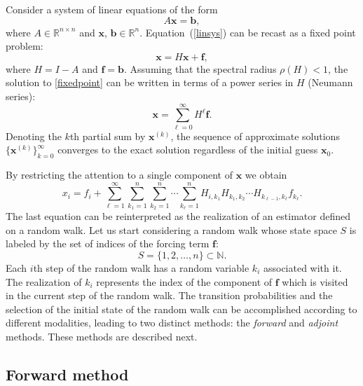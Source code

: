 \documentclass[final,leqno,onefignum,onetabnum]{siamltex1213}
\begin{document}
Consider a system of linear equations of the form
\begin{equation}
A \mathbf{x}=\mathbf{b},
\label{linsys}
\end{equation}
where $A\in \mathbb{R}^{n\times n}$ and $\mathbf{x}$, $\mathbf{b} \in
\mathbb{R}^n$.
Equation~(\ref{linsys}) can be recast as a fixed point problem:
\begin{equation}
 \mathbf{x}=H\mathbf{x}+\mathbf{f},
 \label{fixedpoint}
\end{equation}
where $H=I-A$ and $\mathbf{f}=\mathbf{b}$.
Assuming that the spectral radius $\rho(H)<1$, the solution to
\eqref{fixedpoint} can be written in terms of a power series in
$H$ (Neumann series):
\[
\mathbf{x}=\sum_{\ell=0}^\infty H^\ell\mathbf{f}.
\]
Denoting the $k$th partial sum by $\mathbf{x}^{(k)}$, the sequence of approximate solutions
$\{\mathbf{x}^{(k)}\}_{k=0}^{\infty}$ converges to the exact solution
regardless of the initial guess $\mathbf{x}_0$.

By restricting the attention to a single component of $\mathbf{x}$ we
obtain
\begin{equation}
x_i=f_i + \sum_{\ell=1}^\infty \sum_{k_1=1}^n\sum_{k_2=1}^n\cdots
\sum_{k_{\ell}=1}^n
H_{i,k_1}H_{k_1,k_2}\cdots H_{k_{\ell-1}, k_{\ell}}f_{k_{\ell}}.
\label{forward}
\end{equation}
The last equation can be reinterpreted as the realization of an estimator
defined on a random walk.  Let us start considering a random walk whose
state space $S$ is labeled by the set of indices of the forcing term
$\mathbf{f}$:
\[
S=\{1,2,\ldots, n\} \subset \mathbb{N}.
\]
Each $i$th step of the random walk has a random variable
$k_i$ associated with it. The realization of $k_i$ represents the index of the
component of $\mathbf{f}$
which is visited in the current step of the random walk.
The transition probabilities and the selection of
the initial state of the random walk can be accomplished according to
different modalities, leading to two distinct methods:
the \textit{forward} and \textit{adjoint} methods.
These methods are described next.

\subsection{Forward method}
\label{subsec:forward}
\end{document}
